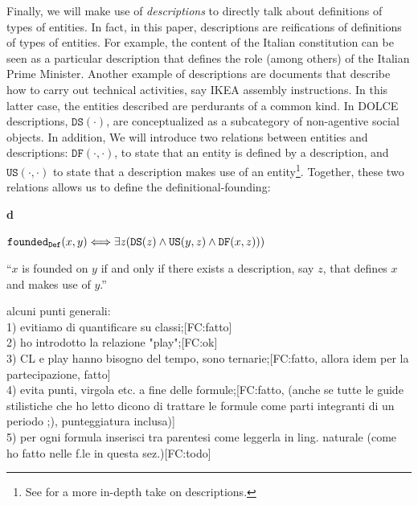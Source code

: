 \documentclass[sw]{iosart2x}
\newcommand{\bflist}{\begin{list}{}{\setlength{\topsep}{2mm}\setlength{\partopsep}{0mm}\setlength{\parsep}{0mm}\setlength{\leftmargin}{9mm}\setlength{\labelwidth}{8mm}}}
\newcommand{\eflist}{\end{list}}
\newcommand{\DefLabel}{\textrm{d}}
\newcounter{cntdef}
\newcommand{\mydf}[1]{\refstepcounter{cntdef}\begin{small}{\bf \DefLabel\thecntdef\label{def:#1}}\end{small}}
\newcommand{\mytext}[1]{``#1''}
\newcommand{\generalStyle}[1]{\texttt{#1}}
\newcommand{\biRel}[3]{\generalStyle{#1}(#2,#3)}
\newcommand{\uniRel}[2]{\generalStyle{#1}(#2)}
\newcommand{\biRelPar}[4]{\generalStyle{#1}_{\generalStyle{#4}}(#2,#3)}
\newcommand{\myiff}{\Longleftrightarrow}
\newcommand{\DOLCE}{\textsc{DOLCE}\xspace} %
\newcommand{\DOLCEDescription}[1]{\uniRel{{DS}}{#1}}
\newcommand{\DOLCEDefinedBy}[2]{\biRel{{DF}}{#1}{#2}}
\newcommand{\DOLCEUsedBy}[2]{\biRel{{US}}{#1}{#2}}
\newcommand{\foundedDef}[2]{\biRelPar{\foundedTerm{passive}}{#1}{#2}{Def}}
\newcommand{\firstTimeKeyWord}[1]{\textit{#1}}
\newcommand{\foundedTerm}[1]{%
  \ifthenelse{\equal{#1}{passive}}{founded}{%
    \ifthenelse{\equal{#1}{verb}}{found}{%
      \ifthenelse{\equal{#1}{gerund}}{founding}{%
        ERROR!%
      }%
    }%
  }%
}
\newcommand{\TODO}[1]{{\color{red} #1}}
\begin{document}
Finally, we will make use of \firstTimeKeyWord{descriptions} to directly talk about definitions of types of entities. In fact, in this paper, descriptions are reifications of definitions of types of entities. For example, the content of the Italian constitution can be seen as a particular description that defines the role (among others) of the Italian Prime Minister. Another example of descriptions are documents that describe how to carry out technical activities, say IKEA assembly instructions. In this latter case, the entities described are perdurants of a common kind.
In \DOLCE descriptions, $\DOLCEDescription{\cdot}$, are conceptualized as a subcategory of non-agentive social objects.
In addition, We will introduce two relations between entities and descriptions: $\DOLCEDefinedBy{\cdot}{\cdot}$, to state that an entity is defined by a description, and $\DOLCEUsedBy{\cdot}{\cdot}$ to state that a description makes use of an entity\footnote{See \cite{masoloSocialRolesTheir2004} for a more in-depth take on descriptions.}. Together, these two relations allows us to define the definitional-founding:
\bflist
\item[\mydf{foundingDefinitionally}] $ \foundedDef{x}{y} \myiff \exists z(\DOLCEDescription{z} \land \DOLCEUsedBy{y}{z} \land \DOLCEDefinedBy{x}{z}) ) $ 
\item \mytext{$x$ is founded on $y$ if and only if there exists a description, say $z$, that defines $x$ and makes use of $y$.}
\eflist 
\TODO{alcuni punti generali:\\
1) evitiamo di quantificare su classi;[FC:fatto]\\ 
2) ho introdotto la relazione "play";[FC:ok]\\ 
3) CL e play hanno bisogno del tempo, sono ternarie;[FC:fatto, allora idem per la partecipazione, fatto]\\
4) evita punti, virgola etc. a fine delle formule;[FC:fatto, (anche se tutte le guide stilistiche che ho letto dicono di trattare le formule come parti integranti di un periodo ;), punteggiatura inclusa)]\\ 
5) per ogni formula inserisci tra parentesi come leggerla in ling. naturale (come ho fatto nelle f.le in questa sez.)[FC:todo]}
\end{document}

